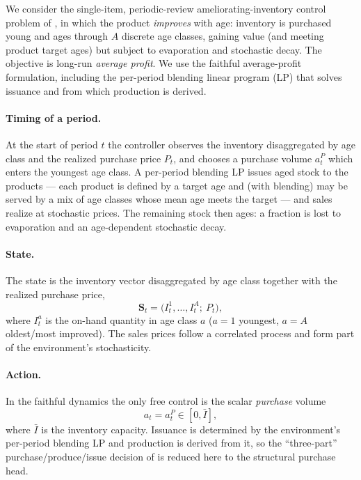 \documentclass[11pt]{article}
\begin{document}
We consider the single-item, periodic-review ameliorating-inventory control problem of
\citet{pahrGrunow2025}, in which the product \emph{improves} with age: inventory is purchased young
and ages through $A$ discrete age classes, gaining value (and meeting product target ages) but subject
to evaporation and stochastic decay. The objective is long-run \emph{average profit}. We use the
faithful average-profit formulation, including the per-period blending linear program (LP) that solves
issuance and from which production is derived.

\paragraph{Timing of a period.}
At the start of period $t$ the controller observes the inventory disaggregated by age class and the
realized purchase price $P_t$, and chooses a purchase volume $a^P_t$ which enters the youngest age
class. A per-period blending LP issues aged stock to the products --- each product is defined by a
target age and (with blending) may be served by a mix of age classes whose mean age meets the target
--- and sales realize at stochastic prices. The remaining stock then ages: a fraction is lost to
evaporation and an age-dependent stochastic decay.

\paragraph{State.}
The state is the inventory vector disaggregated by age class together with the realized purchase
price,
\begin{equation*}
    \mathbf{S}_t=\bigl(I^{1}_t,\dots,I^{A}_t;\ P_t\bigr),
\end{equation*}
where $I^{a}_t$ is the on-hand quantity in age class $a$ ($a=1$ youngest, $a=A$ oldest/most improved).
The sales prices follow a correlated process and form part of the environment's stochasticity.

\paragraph{Action.}
In the faithful dynamics the only free control is the scalar \emph{purchase} volume
\begin{equation*}
    a_t=a^P_t\in[0,\bar I],
\end{equation*}
where $\bar I$ is the inventory capacity. Issuance is determined by the environment's per-period
blending LP and production is derived from it, so the ``three-part'' purchase/produce/issue decision
of \citet{pahrGrunow2025} is reduced here to the structural purchase head.
\end{document}
